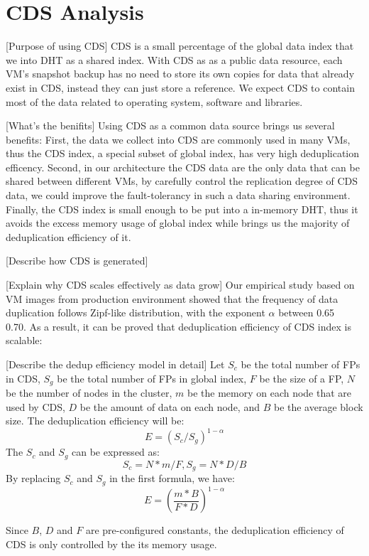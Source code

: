 \section{CDS Analysis}
[Purpose of using CDS]
CDS is a small percentage of the global data index that we into DHT as a shared index. 
With CDS as as a public data resource, each VM's snapshot backup has no need to 
store its own copies for data that already exist in CDS, instead they can just
store a reference. 
We expect CDS to contain most of the data related to operating system, software and libraries.

[What's the benifits]
Using CDS as a common data source brings us several benefits: 
First, the data we collect into CDS are commonly used in many VMs, 
thus the CDS index, a special subset of global index, has very high deduplication efficency.
Second, in our architecture the CDS data are the only data that can be shared between different VMs,
by carefully control the replication degree of CDS data, we could improve the fault-tolerancy
in such a data sharing environment. Finally, the CDS index is small enough to be put into a 
in-memory DHT, thus it avoids the excess memory usage of global index 
while brings us the majority of deduplication efficiency of it.

[Describe how CDS is generated]

[Explain why CDS scales effectively as data grow]
Our empirical study based on VM images from production environment\cite{ieeecloud} showed that the 
frequency of data duplication follows Zipf-like distribution\cite{zipf}, 
with the exponent $\alpha$ between 0.65 ~ 0.70. 
As a result, it can be proved that deduplication efficiency of CDS index is scalable:

[Describe the dedup efficiency model in detail]
Let $S_c$ be the total number of FPs in CDS, $S_g$ be the total number of FPs in global index, $F$ be the size of a FP, $N$ be the number of nodes in the cluster, $m$ be the memory on each node that are used by CDS, $D$ be the amount of data on each node, and $B$ be the average block size. The deduplication efficiency will be:
\begin{equation}
  E = (S_c / S_g)^{1-\alpha}
\end{equation}
The $S_c$ and $S_g$ can be expressed as:
\begin{equation}
S_c = N*m/F, S_g = N*D/B
\end{equation}
By replacing $S_c$ and $S_g$ in the first formula, we have:
\begin{equation}
  E = (\frac{m*B}{F*D})^{1-\alpha}
\end{equation}

Since $B$, $D$ and $F$ are pre-configured constants, the deduplication efficiency of CDS is only controlled by the its memory usage.